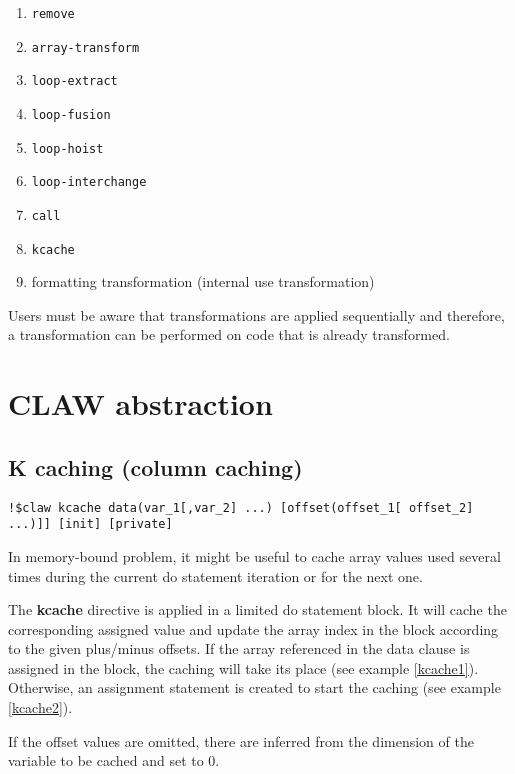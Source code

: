 \documentclass{article}
\begin{document}
\begin{enumerate}
\item \lstinline!remove!
\item \lstinline!array-transform!
\item \lstinline!loop-extract!
\item \lstinline!loop-fusion!
\item \lstinline!loop-hoist!
\item \lstinline!loop-interchange!
\item \lstinline!call!
\item \lstinline!kcache!
\item formatting transformation (internal use transformation)
\end{enumerate}

Users must be aware that transformations are applied sequentially and
therefore, a transformation can be performed on code that is already transformed.

\section{CLAW abstraction}

\subsection{K caching (column caching)}
\begin{lstlisting}
!$claw kcache data(var_1[,var_2] ...) [offset(offset_1[ offset_2] ...)]] [init] [private]
\end{lstlisting}

In memory-bound problem, it might be useful to cache array values used several times during the current do statement iteration or for the next one.

The \textbf{kcache} directive is applied in a limited do statement block. It will cache the corresponding assigned value and update
the array index in the block according to the given plus/minus offsets. If the array referenced in the data clause is assigned in the block, 
the caching will take its place (see example \ref{kcache1}). Otherwise, an assignment statement is created to start the caching (see example \ref{kcache2}). 

If the offset values are omitted, there are inferred from the dimension of the variable to be cached and set to 0.
\end{document}
